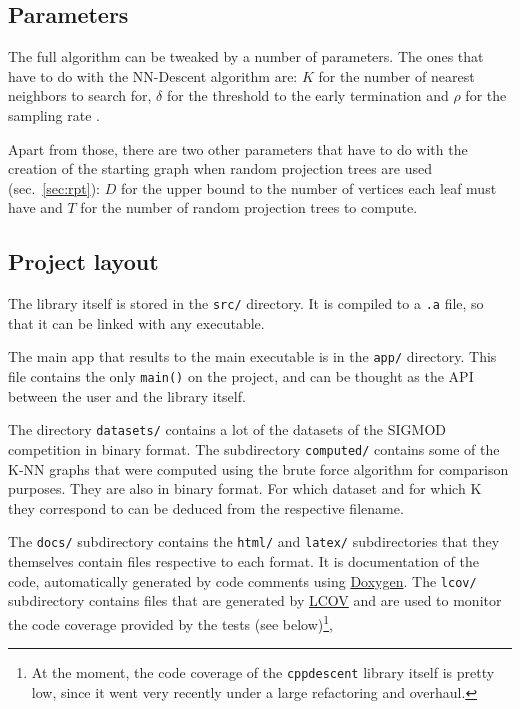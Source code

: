 \documentclass[
  10,
  letterpaperpaper,
  twocolumn]{article}
\begin{document}
\subsection{Parameters}\label{parameters}

The full algorithm can be tweaked by a number of parameters. The ones
that have to do with the NN-Descent algorithm are: \(K\) for the number
of nearest neighbors to search for, \(\delta\) for the threshold to the
early termination \autocite[sec.~2.6]{dongEfficientKnearestNeighbor2011}
and \(\rho\) for the sampling rate
\autocite[sec.~2.5]{dongEfficientKnearestNeighbor2011}.

Apart from those, there are two other parameters that have to do with
the creation of the starting graph when random projection trees are used
(sec.~\ref{sec:rpt}): \(D\) for the upper bound to the number of
vertices each leaf must have and \(T\) for the number of random
projection trees to compute.

\subsection{Project layout}\label{project-layout}

The library itself is stored in the \texttt{src/} directory.
It is compiled to a \texttt{.a} file, so that it can be
linked with any executable.

The main app that results to the main executable is in the
\texttt{app/} directory. This file contains the only
\texttt{main()} on the project, and can be thought as the
API between the user and the library itself.

The directory \texttt{datasets/} contains a lot of the
datasets of the SIGMOD competition in binary format. The subdirectory
\texttt{computed/} contains some of the K-NN graphs that
were computed using the brute force algorithm for comparison purposes.
They are also in binary format. For which dataset and for which K they
correspond to can be deduced from the respective filename.

The \texttt{docs/} subdirectory contains the
\texttt{html/} and \texttt{latex/}
subdirectories that they themselves contain files respective to each
format. It is documentation of the code, automatically generated by code
comments using \href{https://www.doxygen.nl/}{Doxygen}. The
\texttt{lcov/} subdirectory contains files that are
generated by \href{https://github.com/linux-test-project/lcov}{LCOV} and
are used to monitor the code coverage provided by the tests (see
below)\footnote{At the moment, the code coverage of the
  \texttt{cppdescent} library itself is pretty low, since it
  went very recently under a large refactoring and overhaul.},
\end{document}
